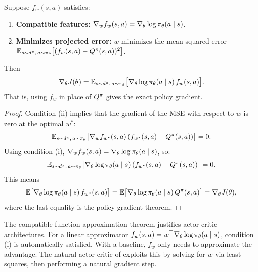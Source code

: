 \documentclass[11pt,a4paper]{article}
\begin{document}
\begin{theorem}
\label{thm:compatible}
Suppose $f_w(s,a)$ satisfies:
\begin{enumerate}[label=(\roman*)]
  \item \textbf{Compatible features:}
    $\nabla_w f_w(s,a) = \nabla_\theta \log \pi_\theta(a \mid s)$.
  \item \textbf{Minimizes projected error:} $w$ minimizes the mean squared
    error $\mathbb{E}_{s \sim d^{\pi},\, a \sim \pi_\theta}
    \bigl[(f_w(s,a) - Q^{\pi}(s,a))^2\bigr]$.
\end{enumerate}
Then
\[
  \nabla_\theta J(\theta)
  = \mathbb{E}_{s \sim d^{\pi},\, a \sim \pi_\theta}
    \bigl[\nabla_\theta \log \pi_\theta(a \mid s)\, f_w(s,a)\bigr].
\]
That is, using $f_w$ in place of $Q^{\pi}$ gives the exact policy gradient.
\end{theorem}

\begin{proof}
Condition (ii) implies that the gradient of the MSE with respect to $w$
is zero at the optimal $w^*$:
\[
  \mathbb{E}_{s \sim d^{\pi},\, a \sim \pi_\theta}
  \bigl[\nabla_w f_{w^*}(s,a)\, (f_{w^*}(s,a) - Q^{\pi}(s,a))\bigr] = 0.
\]
Using condition (i), $\nabla_w f_w(s,a) = \nabla_\theta \log
\pi_\theta(a \mid s)$, so:
\[
  \mathbb{E}_{s \sim d^{\pi},\, a \sim \pi_\theta}
  \bigl[\nabla_\theta \log \pi_\theta(a \mid s)\,
  (f_{w^*}(s,a) - Q^{\pi}(s,a))\bigr] = 0.
\]
This means
\[
  \mathbb{E}\bigl[\nabla_\theta \log \pi_\theta(a \mid s)\, f_{w^*}(s,a)\bigr]
  = \mathbb{E}\bigl[\nabla_\theta \log \pi_\theta(a \mid s)\, Q^{\pi}(s,a)\bigr]
  = \nabla_\theta J(\theta),
\]
where the last equality is the policy gradient theorem.
\end{proof}

\begin{rlconnection}
The compatible function approximation theorem justifies actor-critic
architectures. For a linear approximator
$f_w(s,a) = w^\top \nabla_\theta \log \pi_\theta(a \mid s)$,
condition (i) is automatically satisfied. With a baseline, $f_w$ only
needs to approximate the advantage. The natural actor-critic of
\citet{peters2008} exploits this by solving for $w$ via least squares,
then performing a natural gradient step.
\end{rlconnection}

\end{document}
